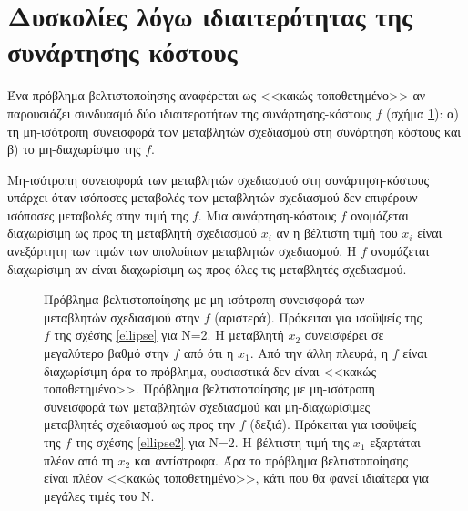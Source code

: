 \section{Δυσκολίες λόγω ιδιαιτερότητας της συνάρτησης κόστους}
Ένα πρόβλημα βελτιστοποίησης αναφέρεται ως <<κακώς τοποθετημένο>> αν παρουσιάζει συνδυασμό δύο ιδιαιτεροτήτων της συνάρτησης-κόστους $f$ (σχήμα \ref{nonsep}): α) τη μη-ισότροπη συνεισφορά των μεταβλητών σχεδιασμού στη συνάρτηση κόστους και β) το μη-διαχωρίσιμο της $f$.

Μη-ισότροπη συνεισφορά των μεταβλητών σχεδιασμού στη συνάρτηση-κόστους υπάρχει όταν ισόποσες μεταβολές των μεταβλητών σχεδιασμού δεν επιφέρουν ισόποσες μεταβολές στην τιμή της $f$.  Μια συνάρτηση-κόστους $f$ ονομάζεται διαχωρίσιμη ως προς τη μεταβλητή σχεδιασμού $x_i$ αν η βέλτιστη τιμή του $x_i$ είναι ανεξάρτητη των τιμών των υπολοίπων μεταβλητών σχεδιασμού. Η $f$ ονομάζεται διαχωρίσιμη αν είναι διαχωρίσιμη ως προς όλες τις μεταβλητές σχεδιασμού.        

\begin{figure}[h!]
\begin{minipage}[b]{1\linewidth}
 \centering
\end{minipage}
\caption{Πρόβλημα βελτιστοποίησης με μη-ισότροπη συνεισφορά των μεταβλητών σχεδιασμού στην $f$ (αριστερά). Πρόκειται για ισοϋψείς της $f$ της σχέσης \ref{ellipse} για Ν=2. Η μεταβλητή $x_2$ συνεισφέρει σε μεγαλύτερο βαθμό στην $f$ από ότι η $x_1$. Από την άλλη πλευρά, η $f$ είναι διαχωρίσιμη άρα το πρόβλημα, ουσιαστικά δεν είναι <<κακώς τοποθετημένο>>. Πρόβλημα βελτιστοποίησης με μη-ισότροπη συνεισφορά των μεταβλητών σχεδιασμού και μη-διαχωρίσιμες μεταβλητές σχεδιασμού ως προς την $f$ (δεξιά). Πρόκειται για ισοϋψείς της $f$ της σχέσης \ref{ellipse2} για Ν=2. Η βέλτιστη τιμή της $x_1$ εξαρτάται πλέον από τη $x_2$ και αντίστροφα. Άρα το πρόβλημα βελτιστοποίησης είναι πλέον <<κακώς τοποθετημένο>>, κάτι που θα φανεί ιδιαίτερα για μεγάλες τιμές του Ν.} 
\label{nonsep}
\end{figure}

